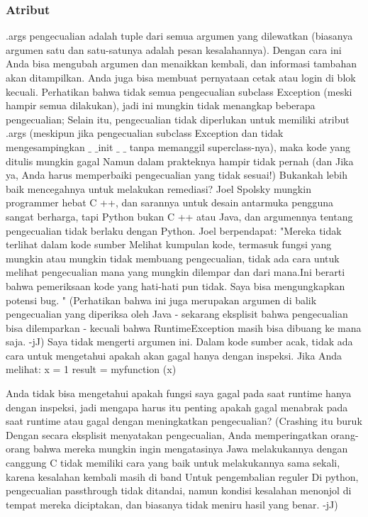 \subsubsection{Atribut}
.args pengecualian adalah tuple dari semua argumen yang dilewatkan (biasanya argumen satu dan satu-satunya adalah pesan kesalahannya). Dengan cara ini Anda bisa mengubah argumen dan menaikkan kembali, dan informasi tambahan akan ditampilkan. Anda juga bisa membuat pernyataan cetak atau login di blok kecuali.
Perhatikan bahwa tidak semua pengecualian subclass Exception (meski hampir semua dilakukan), jadi ini mungkin tidak menangkap beberapa pengecualian; Selain itu, pengecualian tidak diperlukan untuk memiliki atribut .args (meskipun jika pengecualian subclass Exception dan tidak mengesampingkan  $  \_  $ $  \_  $init $  \_  $ $  \_  $ tanpa memanggil superclass-nya), maka kode yang ditulis mungkin gagal Namun dalam prakteknya hampir tidak pernah (dan Jika ya, Anda harus memperbaiki pengecualian yang tidak sesuai!)
Bukankah lebih baik mencegahnya untuk melakukan remediasi?
Joel Spolsky mungkin programmer hebat C ++, dan sarannya untuk desain antarmuka pengguna sangat berharga, tapi Python bukan C ++ atau Java, dan argumennya tentang pengecualian tidak berlaku dengan Python.
Joel berpendapat: 
"Mereka tidak terlihat dalam kode sumber Melihat kumpulan kode, termasuk fungsi yang mungkin atau mungkin tidak membuang pengecualian, tidak ada cara untuk melihat pengecualian mana yang mungkin dilempar dan dari mana.Ini berarti bahwa pemeriksaan kode yang hati-hati pun tidak. Saya bisa mengungkapkan potensi bug. "
(Perhatikan bahwa ini juga merupakan argumen di balik pengecualian yang diperiksa oleh Java - sekarang eksplisit bahwa pengecualian bisa dilemparkan - kecuali bahwa RuntimeException masih bisa dibuang ke mana saja. -jJ)
Saya tidak mengerti argumen ini. Dalam kode sumber acak, tidak ada cara untuk mengetahui apakah akan gagal hanya dengan inspeksi. Jika Anda melihat:
x = 1 
result = myfunction (x) 

Anda tidak bisa mengetahui apakah fungsi saya gagal pada saat runtime hanya dengan inspeksi, jadi mengapa harus itu penting apakah gagal menabrak pada saat runtime atau gagal dengan meningkatkan pengecualian? 
(Crashing itu buruk Dengan secara eksplisit menyatakan pengecualian, Anda memperingatkan orang-orang bahwa mereka mungkin ingin mengatasinya Jawa melakukannya dengan canggung C tidak memiliki cara yang baik untuk melakukannya sama sekali, karena kesalahan kembali masih di band Untuk pengembalian reguler Di python, pengecualian passthrough tidak ditandai, namun kondisi kesalahan menonjol di tempat mereka diciptakan, dan biasanya tidak meniru hasil yang benar. -jJ)

